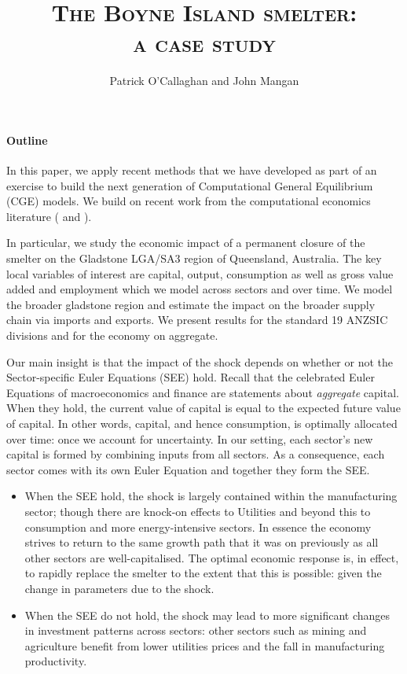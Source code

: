 \documentclass[12pt,a4paper]{article}
\title{\textsc{The Boyne Island smelter:\\
  a case study}}
\author{\small Patrick O’Callaghan and John Mangan}
\begin{document}
\maketitle


\paragraph{Outline}
In this paper, we apply recent methods that we have developed as part of an
exercise to build the next generation of Computational General Equilibrium
(CGE) models.  We build on recent work from the computational economics
literature (\cite{CJ} and \cite{Atalay}).

In particular, we study the economic impact of a permanent closure of the
smelter on the Gladstone LGA/SA3 region of Queensland, Australia. The key local
variables of interest are capital, output, consumption as well as gross value
added and employment which we model across sectors and over time. We model the
broader gladstone region and estimate the impact on the broader supply chain
via imports and exports. We present results for the standard 19 ANZSIC
divisions and for the economy on aggregate.

Our main insight is that the impact of the shock depends on whether or not the
Sector-specific Euler Equations (SEE) hold. Recall that the celebrated Euler
Equations of macroeconomics and finance are statements about \emph{aggregate}
capital.  When they hold, the current value of capital is equal to the expected
future value of capital. In other words, capital, and hence consumption, is
optimally allocated over time: once we account for uncertainty. In our setting,
each sector's new capital is formed by combining inputs from all sectors. As a
consequence, each sector comes with its own Euler Equation and together they
form the SEE.

\begin{itemize}
    
  \item When the SEE hold, the shock is largely contained within the
    manufacturing sector; though there are knock-on effects to Utilities and
    beyond this to consumption and more energy-intensive sectors. In essence
    the economy strives to return to the same growth path that it was on
    previously as all other sectors are well-capitalised. The optimal economic
    response is, in effect, to rapidly replace the smelter to the extent that
    this is possible: given the change in parameters due to the shock.

  \item When the SEE do not hold, the shock may lead to more significant
    changes in investment patterns across sectors: other sectors such as mining
    and agriculture benefit from lower utilities prices and the fall in
    manufacturing productivity.

\end{itemize}
\end{document}
